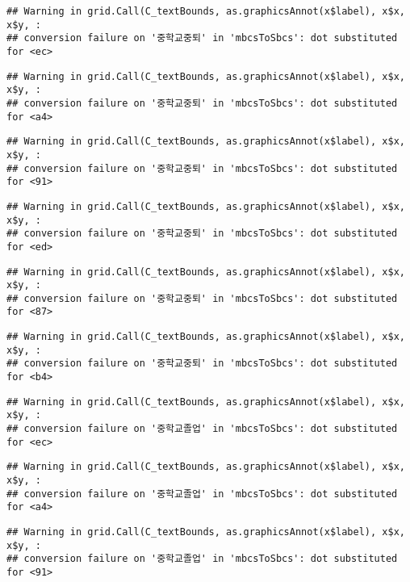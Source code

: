 \documentclass[
]{article}
\begin{document}
\begin{verbatim}
## Warning in grid.Call(C_textBounds, as.graphicsAnnot(x$label), x$x, x$y, :
## conversion failure on '중학교중퇴' in 'mbcsToSbcs': dot substituted for <ec>
\end{verbatim}

\begin{verbatim}
## Warning in grid.Call(C_textBounds, as.graphicsAnnot(x$label), x$x, x$y, :
## conversion failure on '중학교중퇴' in 'mbcsToSbcs': dot substituted for <a4>
\end{verbatim}

\begin{verbatim}
## Warning in grid.Call(C_textBounds, as.graphicsAnnot(x$label), x$x, x$y, :
## conversion failure on '중학교중퇴' in 'mbcsToSbcs': dot substituted for <91>
\end{verbatim}

\begin{verbatim}
## Warning in grid.Call(C_textBounds, as.graphicsAnnot(x$label), x$x, x$y, :
## conversion failure on '중학교중퇴' in 'mbcsToSbcs': dot substituted for <ed>
\end{verbatim}

\begin{verbatim}
## Warning in grid.Call(C_textBounds, as.graphicsAnnot(x$label), x$x, x$y, :
## conversion failure on '중학교중퇴' in 'mbcsToSbcs': dot substituted for <87>
\end{verbatim}

\begin{verbatim}
## Warning in grid.Call(C_textBounds, as.graphicsAnnot(x$label), x$x, x$y, :
## conversion failure on '중학교중퇴' in 'mbcsToSbcs': dot substituted for <b4>
\end{verbatim}

\begin{verbatim}
## Warning in grid.Call(C_textBounds, as.graphicsAnnot(x$label), x$x, x$y, :
## conversion failure on '중학교졸업' in 'mbcsToSbcs': dot substituted for <ec>
\end{verbatim}

\begin{verbatim}
## Warning in grid.Call(C_textBounds, as.graphicsAnnot(x$label), x$x, x$y, :
## conversion failure on '중학교졸업' in 'mbcsToSbcs': dot substituted for <a4>
\end{verbatim}

\begin{verbatim}
## Warning in grid.Call(C_textBounds, as.graphicsAnnot(x$label), x$x, x$y, :
## conversion failure on '중학교졸업' in 'mbcsToSbcs': dot substituted for <91>
\end{verbatim}
\end{document}

